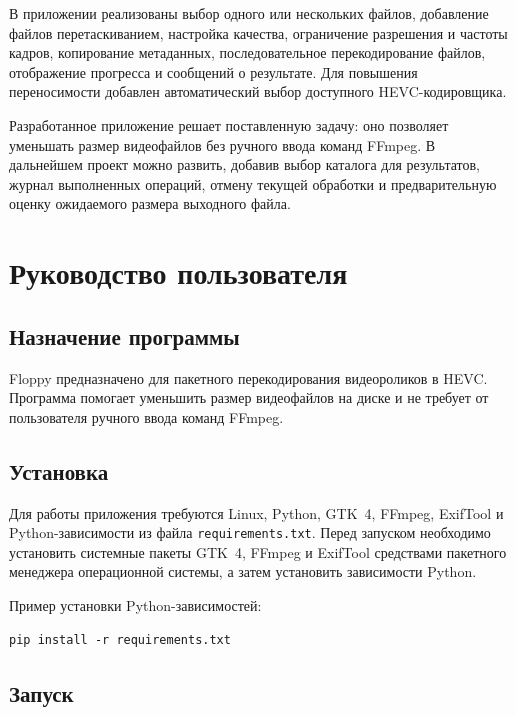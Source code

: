 \documentclass[14pt,a4paper]{extarticle}
\begin{document}
В приложении реализованы выбор одного или нескольких файлов, добавление файлов перетаскиванием, настройка качества, ограничение разрешения и частоты кадров, копирование метаданных, последовательное перекодирование файлов, отображение прогресса и сообщений о результате. Для повышения переносимости добавлен автоматический выбор доступного HEVC-кодировщика.

Разработанное приложение решает поставленную задачу: оно позволяет уменьшать размер видеофайлов без ручного ввода команд FFmpeg. В дальнейшем проект можно развить, добавив выбор каталога для результатов, журнал выполненных операций, отмену текущей обработки и предварительную оценку ожидаемого размера выходного файла.

\printbibliography[heading=bibnumbered,title={Список использованных источников}]

\appendix

\section{Руководство пользователя}

\subsection{Назначение программы}

Floppy предназначено для пакетного перекодирования видеороликов в HEVC. Программа помогает уменьшить размер видеофайлов на диске и не требует от пользователя ручного ввода команд FFmpeg.

\subsection{Установка}

Для работы приложения требуются Linux, Python, GTK~4, FFmpeg, ExifTool и Python-зависимости из файла \texttt{requirements.txt}. Перед запуском необходимо установить системные пакеты GTK~4, FFmpeg и ExifTool средствами пакетного менеджера операционной системы, а затем установить зависимости Python.

Пример установки Python-зависимостей:

\begin{verbatim}
pip install -r requirements.txt
\end{verbatim}

\subsection{Запуск}
\end{document}
